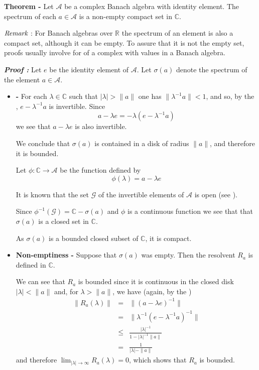 \documentclass[12pt]{article}
\begin{document}
{\bf Theorem -} Let $\mathcal{A}$ be a complex Banach algebra with identity element. The spectrum of each $a \in \mathcal{A}$ is a non-empty compact set in $\mathbb{C}$.

$\emph{Remark}$ : For Banach algebras over $\mathbb{R}$ the spectrum of an element is also a compact set, although it can be empty. To assure that it is not the empty set, proofs usually involve  for  of a complex  with values in a Banach algebra.

{\bf \emph{Proof :}} Let $e$ be the identity element of $\mathcal{A}$. Let $\sigma(a)$ denote the spectrum of the element $a \in \mathcal{A}$.
\begin{itemize}
\item {\bf {} -} For each $\lambda \in \mathbb{C}$ such that $|\lambda| > \|a\|$ one has $\|\lambda^{-1}a\|<1$, and so, by the , $e-\lambda^{-1}a$ is invertible. Since
\begin{displaymath}
a-\lambda e=-\lambda(e-\lambda^{-1}a)
\end{displaymath}
we see that $a-\lambda e$ is also invertible.

We conclude that $\sigma(a)$ is contained in a disk of radius $\|a\|$, and therefore it is bounded.

Let $\phi : \mathbb{C} \longrightarrow \mathcal{A}$ be the function defined by
\begin{displaymath}
\phi(\lambda) = a - \lambda e
\end{displaymath}

It is known that the set $\mathcal{G}$ of the invertible elements of $\mathcal{A}$ is open (see ).

Since $\phi^{-1}(\mathcal{G})=\mathbb{C}-\sigma(a)$ and $\phi$ is a continuous function we see that that $\sigma(a)$ is a closed set in $\mathbb{C}$.

As $\sigma(a)$ is a bounded closed subset of $\mathbb{C}$, it is compact.

\item {\bf Non-emptiness -} Suppose that $\sigma(a)$ was empty. Then the resolvent  $R_a$ is defined in $\mathbb{C}$.

We can see that $R_a$ is bounded since it is continuous in the closed disk $|\lambda|<\|a\|$ and, for $\lambda >\|a\|$, we have (again, by the )
\begin{eqnarray*}
\|R_a(\lambda)\| & = & \|(a-\lambda e)^{-1}\| \\ 
& = & \|\lambda^{-1}(e-\lambda^{-1}a)^{-1}\| \\ 
& \leq & \frac{|\lambda|^{-1}}{1-|\lambda|^{-1}\|a\|} \\
& = & \frac{1}{|\lambda|-\|a\|}
\end{eqnarray*}
and therefore $\displaystyle \lim_{|\lambda| \rightarrow \infty} R_a(\lambda) = 0$, which shows that $R_a$ is bounded.


\end{itemize}
\end{document}
